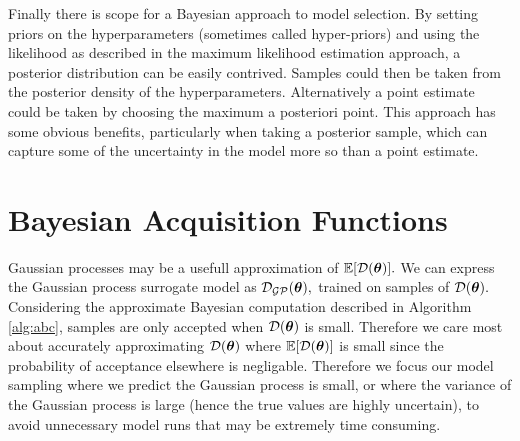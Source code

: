 Finally there is scope for a Bayesian approach to model selection. By setting
priors on the hyperparameters (sometimes called hyper-priors) 
and using the likelihood as described
in the maximum likelihood estimation approach, a posterior distribution can be
easily contrived. Samples could then be taken from the posterior density 
of the hyperparameters. Alternatively a point estimate could be taken by 
choosing the maximum a posteriori point. This
approach has some obvious benefits, particularly when taking a posterior
sample, which can capture some of the uncertainty in the model more so than
a point estimate.




\section{Bayesian Acquisition Functions}

Gaussian processes may be a usefull approximation of $\operatorname{\mathbb{E}}[\mathcal{D}(\bm{\theta})].$ We can
express the Gaussian process surrogate model as $\mathcal{D}_{\mathcal{GP}}(\bm{\theta}),$ trained on
samples of $\mathcal{D}(\bm{\theta}).$
Considering the approximate Bayesian computation described in
Algorithm \ref{alg:abc}, samples are only accepted when $\mathcal{D}(\bm{\theta})$ is small.
Therefore we care most about accurately approximating $\mathcal{D}(\bm{\theta})$ where
$\operatorname{\mathbb{E}}[\mathcal{D}(\bm{\theta})]$ is small since the probability of acceptance elsewhere is
negligable. Therefore we focus our model sampling where we predict the Gaussian
process is small, or where the variance of the Gaussian process is large 
(hence the true values are highly uncertain), to avoid unnecessary model runs
that may be extremely time consuming.

